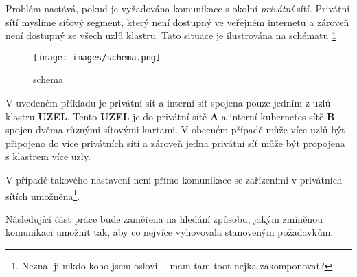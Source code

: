 Problém nastává, pokud je vyžadována komunikace s okolní \textit{privátní} sítí. Privátní sítí myslíme síťový segment, který není dostupný ve veřejném internetu a zároveň není dostupný ze všech uzlů klastru. Tato situace je ilustrována na schématu \ref{fig:schema}

\begin{figure}[!ht]
    \centering
    \texttt{[image: images/schema.png]}
    \caption{schema}
    \label{fig:schema}
\end{figure}

V uvedeném příkladu je privátní síť a interní síť spojena pouze jedním z uzlů klastru \textbf{UZEL}. Tento \textbf{UZEL} je do privátní sítě \textbf{A} a interní kubernetes sítě \textbf{B} spojen dvěma různými sítovými kartami.   V obecném případě může více uzlů být připojeno do více privátních sítí a zároveň jedna privátní síť může být propojena s klastrem více uzly.

V případě takového nastavení není přímo komunikace se zařízeními v privátních sítích umožněna\footnote{Neznal ji nikdo koho jsem oslovil - mam tam toot nejka zakomponovat?}.

Následující část práce bude zaměřena na hledání způsobu, jakým zmíněnou komunikaci umožnit tak, aby co nejvíce vyhovovala stanoveným požadavkům. 

